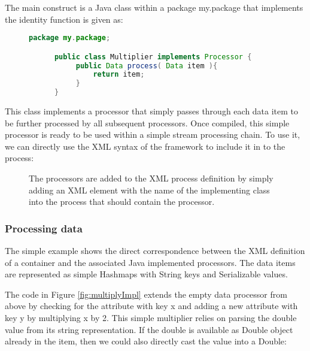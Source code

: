 The main construct is a Java class within a package {\ttfamily my.package}
that implements the identity function is given as:

\begin{figure}[h!]
  \centering
  \begin{lstlisting}[language=Java]
      package my.package;

      public class Multiplier implements Processor {
           public Data process( Data item ){
               return item;
           }
      }
  \end{lstlisting}
\end{figure}

This class implements a processor that simply passes through each data
item to be further processed by all subsequent processors.  Once
compiled, this simple processor is ready to be used within a simple
stream processing chain. To use it, we can directly use the XML syntax
of the \streams framework to include it in to the process:

\begin{figure}[h!]
\caption{\label{fig:multiplyXML}The processors are added to the XML
  process definition by simply adding an XML element with the name of
  the implementing class into the process that should contain the
  processor.}
\end{figure}


\subsubsection*{Processing data}
The simple example shows the direct correspondence between the XML
definition of a container and the associated Java implemented
processors. The data items are represented as simple Hashmaps with
{\ttfamily String} keys and {\ttfamily Serializable} values.

The code in Figure \ref{fig:multiplyImpl} extends the empty data
processor from above by checking for the attribute with key {\ttfamily
x} and adding a new attribute with key {\ttfamily y} by multiplying
{\ttfamily x} by 2. This simple multiplier relies on parsing the double value from its
string representation. If the double is available as Double object
already in the item, then we could also directly cast the value into a
Double:

